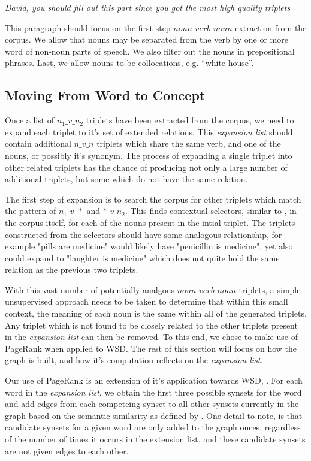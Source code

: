 \documentclass[11pt]{article}
\begin{document}
\emph{David, you should fill out this part since you got the most high quality
triplets}

This paragraph should focus on the first step $noun\_verb\_noun$ extraction from the corpus.
We allow that nouns may be separated from the verb by one or more word of
non-noun parts of speech.  We also filter out the nouns in prepositional
phrases.  Last, we allow nouns to be collocations, e.g. ``white house''.

\subsection{Moving From Word to Concept}

Once a list of $n_1\_v\_n_2$ triplets have been extracted from the corpus, we need to
expand each triplet to it's set of extended relations.  This \emph{expansion
list} should contain additional $n\_v\_n$ triplets which share the same verb,
and one of the nouns, or possibly it's synonym.  The process of expanding a
single triplet into other related triplets has the chance of producing not only
a large number of additional triplets, but some which do not have the same
relation.  

The first step of expansion is to search the corpus for other triplets which match
the pattern of $n_1\_v\_*$ and $*\_v\_n_2$.  This finds contextual
selectors, similar to \cite{schwartz08selectors}, in the corpus itself, for each of
the nouns present in the intial triplet.  The triplets constructed from the
selectors should have some analogous relationship, for example "pills are 
medicine" would likely have "penicillin is medicine", yet also could expand to
"laughter is medicine" which does not quite hold the same relation as the
previous two triplets.  

With this vast number of potentially analgous $noun\_verb\_noun$ triplets, a
simple unsupervised approach needs to be taken to determine that within this
small context, the meaning of each noun is the same
within all of the generated triplets.  Any triplet which is not found to be
closely related to the other triplets present in the \emph{expansion list} can then be
removed.  To this end, we chose to make use of PageRank when applied to
WSD.  The rest of this section will focus on how the graph is built, and how
it's computation reflects on the \emph{expansion list}.

Our use of PageRank is an extension of it's application towards WSD,
\cite{mihalcea04wsdpagerank,mihalcea06randomwalks}.  For each word in
the \emph{expansion list}, we obtain the first three possible synsets for the word and
add edges from each competeing synset to all other synsets currently in the
graph based on the semantic similarity as defined by
\cite{banerjee03extendedgloss}.  One detail to note, is that candidate synsets
for a given word are only added to the graph onces, regardless of the number of
times it occurs in the extension list, and these candidate synsets are not
given edges to each other. 
\end{document}
